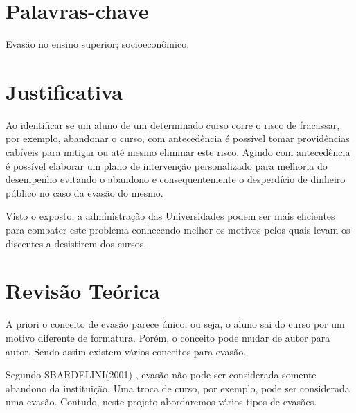 \section{Palavras-chave}%
Evasão no ensino superior; socioeconômico.


\section{Justificativa}%

Ao identificar se um aluno de um determinado curso corre o risco de fracassar, por exemplo, abandonar o curso, com antecedência é possível tomar providências cabíveis para mitigar ou até mesmo eliminar este risco. Agindo com antecedência é possível elaborar um plano de intervenção personalizado para melhoria do desempenho evitando o abandono e consequentemente o desperdício de dinheiro público no caso da evasão do mesmo.

Visto o exposto, a administração das Universidades podem ser mais eficientes para combater este problema conhecendo melhor os motivos pelos quais levam os discentes a desistirem dos cursos.  
 \begin{comment} 
\section{Metodologia}%

Para realização do estudo serão usadas como fonte as bases de dados dos sistemas de controle acadêmicos da Universidade de Brasília, com enfoque no ciclo de vida acadêmico dos discentes e docentes. Aplicar técnicas de mineração de dados para a descoberta de novos padrões relacionados as diversas formas de evasões dos cursos ofertados pela UnB para que possam prever tendências que  auxiliarão a equipe de planejamento a acompanhar e definir as metas e diretrizes da Universidade no âmbito acadêmico.
\end{comment}

\section{Revisão Teórica}%

A priori o conceito de evasão parece único, ou seja, o aluno sai do curso por um motivo diferente de formatura.  Porém, o conceito pode mudar de autor para autor. Sendo assim existem vários conceitos para evasão. 

Segundo SBARDELINI(2001) \cite{Teresa2001IdentidadeUniversitaria}, evasão não pode ser considerada somente abandono da instituição. Uma troca de curso, por exemplo, pode ser considerada uma evasão. Contudo, neste projeto abordaremos vários tipos de evasões.
 
